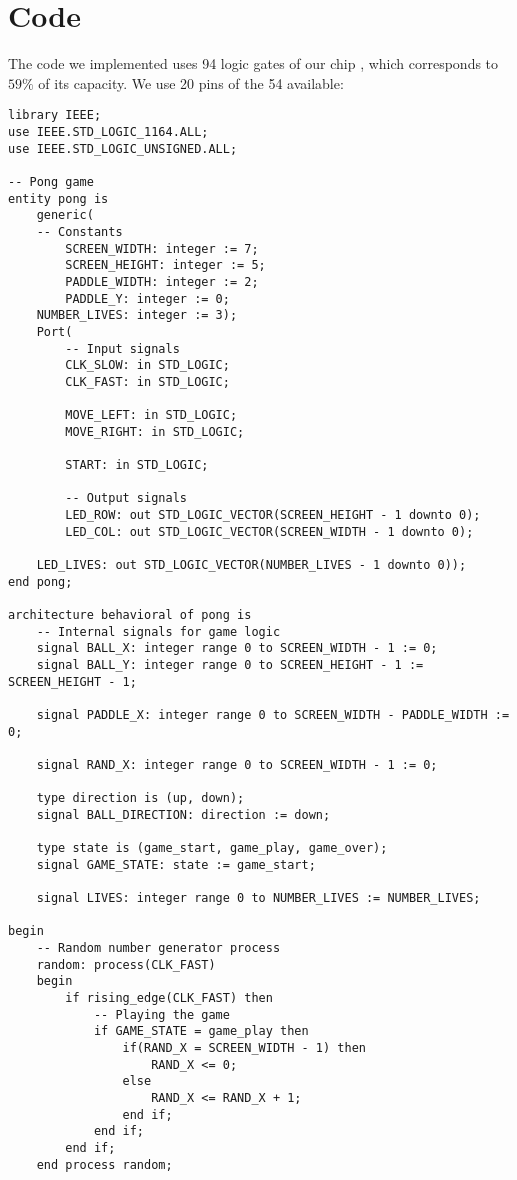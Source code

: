 \section{Code} \label{Code}
The code we implemented uses 94 logic gates of our chip , which corresponds to $59\% $ of its capacity. We use 20 pins of the 54 available:
\begin{verbatim}
library IEEE;
use IEEE.STD_LOGIC_1164.ALL;
use IEEE.STD_LOGIC_UNSIGNED.ALL;

-- Pong game
entity pong is
    generic(
	-- Constants
        SCREEN_WIDTH: integer := 7;
        SCREEN_HEIGHT: integer := 5;
        PADDLE_WIDTH: integer := 2;
        PADDLE_Y: integer := 0;
	NUMBER_LIVES: integer := 3);
    Port(
        -- Input signals
        CLK_SLOW: in STD_LOGIC;
        CLK_FAST: in STD_LOGIC;

        MOVE_LEFT: in STD_LOGIC;
        MOVE_RIGHT: in STD_LOGIC;

        START: in STD_LOGIC;

        -- Output signals
        LED_ROW: out STD_LOGIC_VECTOR(SCREEN_HEIGHT - 1 downto 0);
        LED_COL: out STD_LOGIC_VECTOR(SCREEN_WIDTH - 1 downto 0);

	LED_LIVES: out STD_LOGIC_VECTOR(NUMBER_LIVES - 1 downto 0));
end pong;

architecture behavioral of pong is
    -- Internal signals for game logic
    signal BALL_X: integer range 0 to SCREEN_WIDTH - 1 := 0;
    signal BALL_Y: integer range 0 to SCREEN_HEIGHT - 1 := SCREEN_HEIGHT - 1;

    signal PADDLE_X: integer range 0 to SCREEN_WIDTH - PADDLE_WIDTH := 0;

    signal RAND_X: integer range 0 to SCREEN_WIDTH - 1 := 0;

    type direction is (up, down);
    signal BALL_DIRECTION: direction := down;

    type state is (game_start, game_play, game_over);
    signal GAME_STATE: state := game_start;

    signal LIVES: integer range 0 to NUMBER_LIVES := NUMBER_LIVES;
	 
begin
    -- Random number generator process
    random: process(CLK_FAST)
    begin
        if rising_edge(CLK_FAST) then
            -- Playing the game
            if GAME_STATE = game_play then
                if(RAND_X = SCREEN_WIDTH - 1) then
                    RAND_X <= 0;
                else 
                    RAND_X <= RAND_X + 1;
                end if; 
            end if;
        end if;
    end process random;
    

\end{verbatim}
